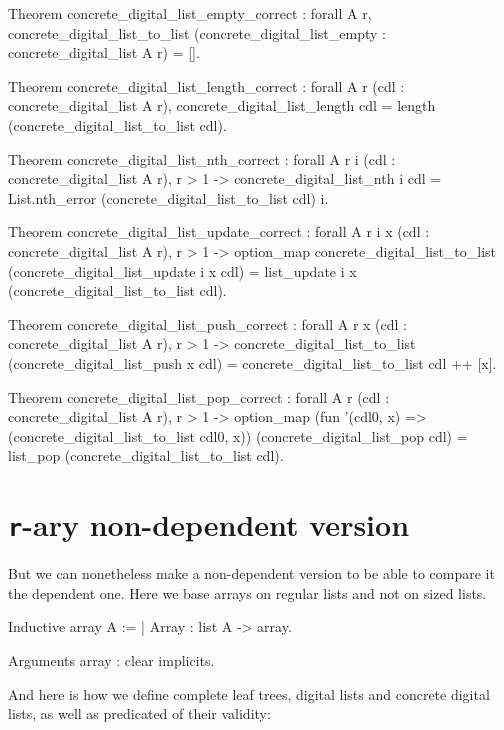 \documentclass{article}
\begin{document}
\begin{coq}
Theorem concrete_digital_list_empty_correct :
  forall {A r},
  concrete_digital_list_to_list (concrete_digital_list_empty : concrete_digital_list A r) = [].

Theorem concrete_digital_list_length_correct :
  forall {A r} (cdl : concrete_digital_list A r),
  concrete_digital_list_length cdl = length (concrete_digital_list_to_list cdl).

Theorem concrete_digital_list_nth_correct :
  forall {A r} i (cdl : concrete_digital_list A r),
  r > 1 ->
  concrete_digital_list_nth i cdl = List.nth_error (concrete_digital_list_to_list cdl) i.

Theorem concrete_digital_list_update_correct :
  forall {A r} i x (cdl : concrete_digital_list A r),
  r > 1 ->
  option_map concrete_digital_list_to_list (concrete_digital_list_update i x cdl) =
    list_update i x (concrete_digital_list_to_list cdl).

Theorem concrete_digital_list_push_correct :
  forall {A r} x (cdl : concrete_digital_list A r),
  r > 1 ->
  concrete_digital_list_to_list (concrete_digital_list_push x cdl) =
    concrete_digital_list_to_list cdl ++ [x].

Theorem concrete_digital_list_pop_correct :
  forall {A r} (cdl : concrete_digital_list A r),
  r > 1 ->
  option_map
    (fun '(cdl0, x) => (concrete_digital_list_to_list cdl0, x))
    (concrete_digital_list_pop cdl) = list_pop (concrete_digital_list_to_list cdl).
\end{coq}

\section{\texttt{r}-ary non-dependent version}

But we can nonetheless make a non-dependent version to be able to compare it the dependent one. Here we base arrays on regular lists and not on sized lists.

\begin{coq}
Inductive array {A} :=
  | Array : list A -> array.

Arguments array : clear implicits.
\end{coq}

And here is how we define complete leaf trees, digital lists and concrete digital lists, as well as predicated of their validity:
\end{document}
